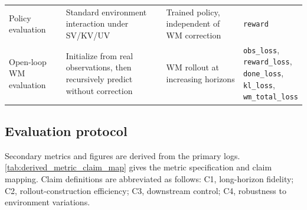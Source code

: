 \documentclass{article}
\theoremstyle{plain}
\theoremstyle{definition}
\theoremstyle{remark}
\begin{document}
\begin{table}[h!]
{\begin{tabular}{llll}
      Policy evaluation                                                              &
      Standard environment interaction under SV/KV/UV                                &
      Trained policy, independent of WM correction                                   &
      \texttt{reward}                                                                  \\

      Open-loop WM evaluation                                                        &
      Initialize from real observations, then recursively predict without correction &
      WM rollout at increasing horizons                                              &
      \makecell[l]{
      \texttt{obs\_loss},                                                              \\
      \texttt{reward\_loss},                                                           \\
      \texttt{done\_loss},                                                             \\
      \texttt{kl\_loss},                                                               \\
        \texttt{wm\_total\_loss}
      }                                                                                \\

      \bottomrule
    \end{tabular}
  }
\end{table}

\subsection{Evaluation protocol}
\label{sec:evaluation_protocol}
\label{sec:metrics_protocol}

Secondary metrics and figures are derived from the primary logs. \autoref{tab:derived_metric_claim_map} gives the metric specification and claim mapping. Claim definitions are abbreviated as follows: C1, long-horizon fidelity; C2, rollout-construction efficiency; C3, downstream control; C4, robustness to environment variations.
\end{document}
